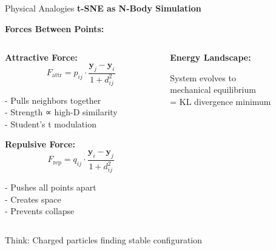 \documentclass[10pt]{beamer}
\newcommand{\emphtext}[1]{\textcolor{upcblue}{\textbf{#1}}}
\newcommand{\conceptbox}[1]{\colorbox{upcblue!10}{\begin{minipage}{0.85\textwidth}\centering #1\end{minipage}}}
\begin{document}
\begin{frame}{Physical Analogies}
\emphtext{t-SNE as N-Body Simulation}

\vspace{0.3cm}
\textbf{Forces Between Points:}

\begin{columns}[T]
\begin{column}{0.48\textwidth}
\textbf{Attractive Force:}
$$F_{\text{attr}} = p_{ij} \cdot \frac{\mathbf{y}_j - \mathbf{y}_i}{1+d_{ij}^2}$$

\footnotesize
- Pulls neighbors together\\
- Strength ∝ high-D similarity\\
- Student's t modulation

\vspace{0.2cm}
\textbf{Repulsive Force:}
$$F_{\text{rep}} = q_{ij} \cdot \frac{\mathbf{y}_i - \mathbf{y}_j}{1+d_{ij}^2}$$

\footnotesize
- Pushes all points apart\\
- Creates space\\
- Prevents collapse
\end{column}

\begin{column}{0.48\textwidth}
\textbf{Energy Landscape:}


\vspace{0.2cm}
\footnotesize
System evolves to\\
mechanical equilibrium\\
= KL divergence minimum
\end{column}
\end{columns}

\vspace{0.3cm}
\begin{center}
\conceptbox{\footnotesize Think: Charged particles finding stable configuration}
\end{center}
\end{frame}
\end{document}
